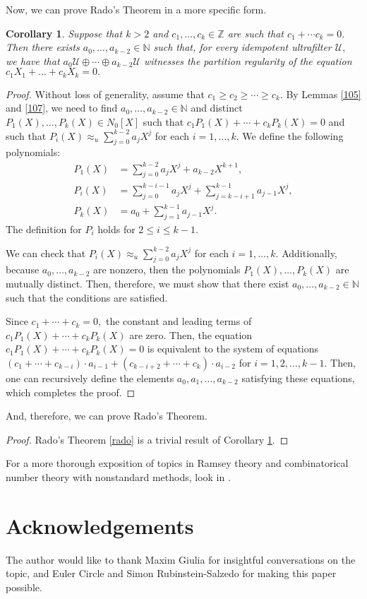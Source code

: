 \documentclass[12pt]{amsart}
\newcommand{\NN}{\mathbb{N}}
\newcommand{\ZZ}{\mathbb{Z}}
\newcommand{\mcU}{\mathcal{U}}
\theoremstyle{plain}
\newtheorem{cor}[thm]{Corollary}
\theoremstyle{definition}
\theoremstyle{remark}
\theoremstyle{theorem}
\numberwithin{equation}{section}
\numberwithin{thm}{section}
\begin{document}
Now, we can prove Rado's Theorem in a more specific form.
\begin{cor} \label{thecorrolary}
Suppose that $k>2$ and $c_1, \ldots , c_k \in \ZZ$ are such that $c_1 + \cdots c_k = 0.$ Then there exists $a_0, \ldots , a_{k-2} \in \NN$ such that, for every idempotent ultrafilter $\mcU,$ we have that $a_0 \mcU \oplus \cdots \oplus a_{k-2}\mcU$ witnesses the partition regularity of the equation $c_1X_1 + \ldots + c_kX_k = 0.$
\end{cor}
\begin{proof}
Without loss of generality, assume that $c_1 \geq c_2 \geq \cdots \geq c_k.$ By Lemmas \ref{105} and \ref{107}, we need to find $a_0, \ldots , a_{k-2} \in \NN$ and distinct $P_1(X), \ldots, P_k(X) \in N_0[X]$ such that $c_1P_1(X) + \cdots + c_kP_k(X) = 0$ and such that $P_i(X) \approx_u \sum_{j=0}^{k-2}a_jX^j$ for each $i = 1, \ldots , k.$ We define the following polynomials:
\begin{align*}
    P_1(X) &= \sum_{j=0}^{k-2} a_jX^j + a_{k-2}X^{k+1}, \\
    P_i(X) &= \sum_{j=0}^{k-i-1} a_jX^j + \sum_{j=k-i+1}^{k-1}a_{j-1}X^j, \\
    P_k(X) &= a_0 + \sum_{j=1}^{k-1} a_{j-1}X^j.
\end{align*}
The definition for $P_i$ holds for $2\leq i \leq k-1.$ 

We can check that $P_i(X) \approx_u \sum_{j=0}^{k-2} a_j X^j$ for each $i = 1, \ldots , k.$ Additionally, because $a_0, \ldots , a_{k-2}$ are nonzero, then the polynomials $P_1(X) ,\ldots , P_k(X)$ are mutually distinct. Then, therefore, we must show that there exist $a_0, \ldots, a_{k-2} \in \NN$ such that the conditions are satisfied. 

Since $c_1 + \cdots + c_k = 0,$ the constant and leading terms of $c_1P_1(X) + \cdots + c_kP_k(X)$ are zero. Then, the equation $c_1P_1(X) + \cdots + c_kP_k(X) = 0$ is equivalent to the system of equations $(c_1 + \cdots + c_{k-i}) \cdot a_{i-1} + (c_{k-i+2} + \cdots + c_k)\cdot a_{i-2}$ for $i = 1,2, \ldots, k-1.$ Then, one can recursively define the elements $a_0, a_1, \ldots , a_{k-2}$ satisfying these equations, which completes the proof.
\end{proof}
And, therefore, we can prove Rado's Theorem.
\begin{proof}
Rado's Theorem \ref{rado} is a trivial result of Corollary \ref{thecorrolary}.
\end{proof}
For a more thorough exposition of topics in Ramsey theory and combinatorical number theory with nonstandard methods, look in \cite{Di19}.
\section{Acknowledgements}
The author would like to thank Maxim Giulia for insightful conversations on the topic, and Euler Circle and Simon Rubinstein-Salzedo for making this paper possible.


\end{document}
